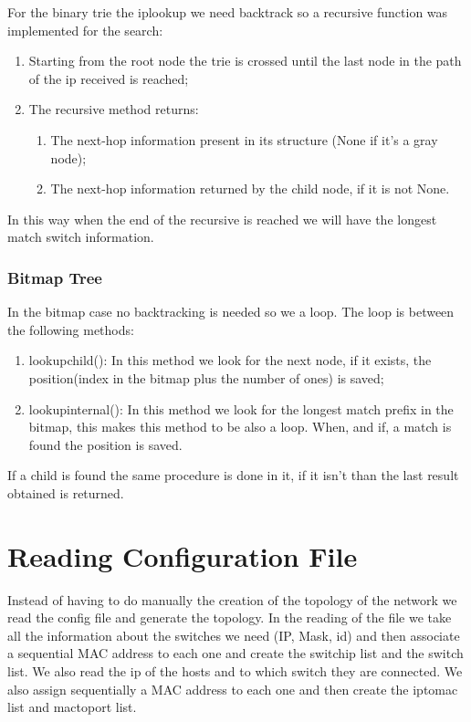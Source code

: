 \documentclass[]{report}
\begin{document}
For the binary trie the ip\textunderscore lookup we need backtrack so a recursive function was implemented for the search:
\begin{enumerate}
\item Starting from the root node the trie is crossed until the last node in the path of the ip received is reached;
\item The recursive method returns:
\begin{enumerate}
\item The next-hop information present in its structure (None if it’s a gray node);
\item The next-hop information returned by the child node, if it is not None.
\end{enumerate}
\end{enumerate}

In this way when the end of the recursive is reached we will have the longest match switch information.


\subsubsection{Bitmap Tree}
In the bitmap case no backtracking is needed so we a loop. The loop is between the following methods:
\begin{enumerate}
\item lookup\textunderscore child(): In this method we look for the next node, if it exists, the position(index in the bitmap plus the number of ones) is saved;
\item lookup\textunderscore internal(): In this method we look for the longest match prefix in the bitmap, this makes this method to be also a loop. When, and if, a match is found the position is saved.
\end{enumerate}
If a child is found the same procedure is done in it, if it isn’t than the last result obtained is returned.


\section{Reading Configuration File}
\label{sec:config}
	Instead of having to do manually the creation of the topology of the network we read the config file and generate the topology. In the reading of the file we take all the information about the switches we need (IP, Mask, id) and then associate a sequential MAC address to each one and create the switch\textunderscore ip list and the switch list. We also read the ip of the hosts and to which switch they are connected. We also assign sequentially a MAC address to each one and then create the ip\textunderscore to\textunderscore mac list and mac\textunderscore to\textunderscore port list.
	
\end{document}
